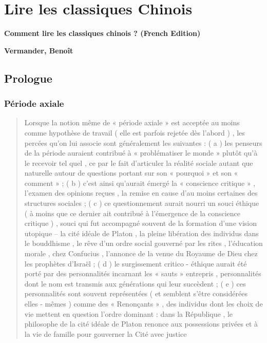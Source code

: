 \chapter{Lire les classiques Chinois}

 

\textbf{Comment lire les classiques chinois ? (French Edition)}

\textbf{Vermander, Benoît}

\section{Prologue}


\subsection{Période axiale}
   \begin{quote}
Lorsque la notion même de « période axiale » est acceptée au moins comme
hypothèse de travail ( elle est parfois rejetée dès l'abord ) , les
percées qu'on lui associe sont généralement les suivantes : ( a ) les
penseurs de la période auraient contribué à « problématiser le monde »
plutôt qu'à le recevoir tel quel , ce par le fait d'articuler la réalité
sociale autant que naturelle autour de questions portant sur son «
pourquoi » et son « comment » ; ( b ) c'est ainsi qu'aurait émergé la «
conscience critique » , l'examen des opinions reçues , la remise en
cause d'au moins certaines des structures sociales ; ( c ) ce
questionnement
aurait nourri un souci éthique ( à moins que ce dernier ait contribué à
l'émergence de la conscience critique ) , souci qui fut accompagné
souvent de la formation d'une vision utopique -- la cité idéale de
Platon , la pleine libération des individus dans le bouddhisme , le rêve
d'un ordre social gouverné par les rites , l'éducation morale , chez
Confucius , l'annonce de la venue du Royaume de Dieu chez les prophètes
d'Israël ; ( d ) le surgissement critico - éthique aurait été porté par
des personnalités incarnant les « sauts » entrepris , personnalités dont
le nom est transmis aux générations qui leur succèdent ; ( e ) ces
personnalités sont souvent représentées ( et semblent s'être considérées
elles - mêmes ) comme des « Renonçants » , des individus dont les choix
de vie mettent en question l'ordre dominant : dans la République , le
philosophe de la cité idéale de Platon renonce aux possessions privées
et à la vie de famille pour gouverner la Cité avec justice

\end{quote}  

